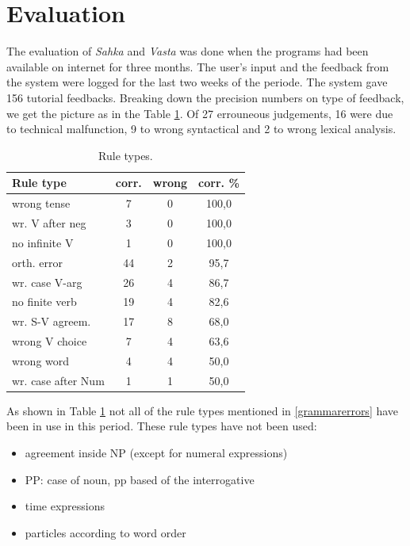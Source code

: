 \documentclass[11pt]{article}
\begin{document}
\section{Evaluation}
The evaluation of \textit{Sahka} and \textit{Vasta} was done when the programs had been available on internet for three months. The user's input and the feedback from the system were logged for the last two weeks of the periode. The system gave 156 tutorial feedbacks. Breaking down the precision numbers on type of feedback, we get the picture as in the Table \ref{ruletypes}. Of 27 errouneous judgements, 16 were due to technical malfunction, 9 to wrong syntactical and 2 to wrong lexical analysis. \\

\begin{table}[htbp]
\begin{tabular}{|l|c|c|c|}
\hline 
\textbf{Rule type}  & \textbf{corr.} & \textbf{wrong}   & \textbf{corr. \% }  \\
\hline 
wrong tense         & 7     & 0     & 100,0     \\ 
wr. V after neg   & 3     & 0     & 100,0     \\ 
no infinite V       & 1     & 0     & 100,0     \\ 
\hline 
orth. error         & 44    & 2     & 95,7      \\
wr. case V-arg  & 26    & 4     & 86,7      \\
no finite verb        & 19    & 4     &  82,6 \\
\hline 
wr. S-V agreem.   & 17    & 8     & 68,0 \\
wrong V choice        & 7     & 4     & 63,6 \\
\hline 
wrong word            & 4     & 4     & 50,0 \\
wr. case after Num  & 1     & 1     & 50,0 \\
\hline
\end{tabular}
\caption{Rule types.}
\label{ruletypes}
\end{table}

As shown in Table \ref{ruletypes} not all of the rule types mentioned in \ref{grammarerrors} have been in use in this period. These rule types have not been used: \\

\begin{itemize}
\setlength{\itemsep}{-0.7cm}
\item agreement inside NP (except for numeral expressions) \\
\item PP: case of noun, pp based of the interrogative  \\
\item time expressions \\
\item particles according to word order \\
\end{itemize}
\end{document}
